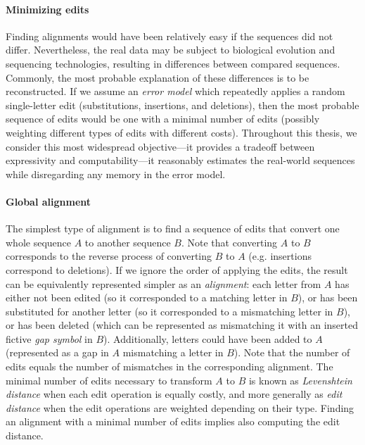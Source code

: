 
\paragraph{Minimizing edits}
Finding alignments would have been relatively easy if the sequences did not
differ. Nevertheless, the real data may be subject to biological evolution and
sequencing technologies, resulting in differences between compared sequences.
Commonly, the most probable explanation of these differences is to be
reconstructed. If we assume an \emph{error model} which repeatedly applies a
random single-letter edit (substitutions, insertions, and deletions), then the
most probable sequence of edits would be one with a minimal number of edits
(possibly weighting different types of edits with different costs). Throughout
this thesis, we consider this most widespread objective---it provides a tradeoff
between expressivity and computability---it reasonably estimates the real-world
sequences while disregarding any memory in the error model.

\paragraph{Global alignment}
The simplest type of alignment is to find a sequence of edits that convert one
whole sequence $A$ to another sequence $B$. Note that converting $A$ to $B$
corresponds to the reverse process of converting $B$ to $A$ (e.g. insertions
correspond to deletions). If we ignore the order of applying the edits, the
result can be equivalently represented simpler as an \emph{alignment}: each
letter from $A$ has either not been edited (so it corresponded to a matching
letter in $B$), or has been substituted for another letter (so it corresponded
to a mismatching letter in $B$), or has been deleted (which can be represented
as mismatching it with an inserted fictive \emph{gap symbol} in $B$).
Additionally, letters could have been added to $A$ (represented as a gap in $A$
mismatching a letter in $B$). Note that the number of edits equals the number of
mismatches in the corresponding alignment. The minimal number of edits necessary
to transform $A$ to $B$ is known as \emph{Levenshtein distance} when each edit
operation is equally costly, and more generally as \emph{edit distance} when the
edit operations are weighted depending on their type. Finding an alignment with
a minimal number of edits implies also computing the edit distance.

